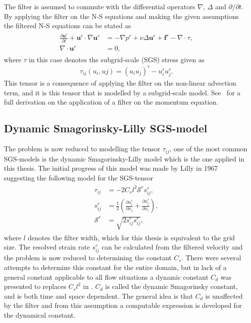 The filter is assumed to commute with 
the differential operators $\nabla$, $\Delta$ and $\partial / \partial t$. By applying the filter on the N-S equations
and making the given assumptions the filtered N-S equations can be stated as 
%
\begin{align}
    \begin{split}
        \frac{\partial \mathbf{u}^r}{\partial t} + \mathbf{u}^r\cdot \nabla\mathbf{u}^r
        &= -\nabla p^r +\nu\Delta \mathbf{u}^r+\mathbf{f}^r-\nabla \cdot \tau, \\
        \nabla \cdot \mathbf{u}^r &= 0,
    \end{split}
	\label{eq:NSfiltered}
\end{align}
%
where $\tau$ in this case denotes the subgrid-scale (SGS) stress given as 
\begin{align}
    \tau_{ij}(u_i,uj) = (u_iu_j)^r -u_i^ru_j^r.
    \label{eq:sgstensor}
\end{align}
%
This tensor is a consequence of applying the filter on the non-linear advection term, 
and it is this tensor that is modelled by a subgrid-scale model. See~\cite{Pope} for a full derivation on the 
application of a filter on the momentum equation. 

\subsection{Dynamic Smagorinsky-Lilly SGS-model}
The problem is now reduced to modelling the tensor $\tau_{ij}$, one of the most common SGS-models is the 
dynamic Smagorinsky-Lilly model which is the one applied in this thesis. The initial progress of this model was made by 
Lilly in 1967~\cite{Lilly67} suggesting the following model for the SGS-tensor
%
\begin{align}
    \begin{split}
    \tau_{ij} &= -2C_sl^2\mathcal{S}^rs_{ij}^r,\\
    s^r_{ij} &= \frac{1}{2}\left( \frac{\partial u^r_i}{\partial x_j} +
    \frac{\partial u^r_j}{\partial x_i}\right),\\
    \mathcal{S}^r &= \sqrt{2s^r_{ij}s^r_{ij}},
    \end{split}
    \label{eq:boussinesq}
\end{align}
%
where $l$ denotes the filter width, which for this thesis is equivalent to the grid size.
The resolved strain rate $s^r_{ij}$ can be calculated from the filtered velocity and the problem is now reduced to determining
the constant $C_s$. There were several attempts to determine this constant for the entire domain, but in lack of a general 
constant applicable to all flow situations a dynamic constant $C_d$ was presented to replaces $C_sl^2$ in .
$C_d$ is called the dynamic Smagorinsky constant, and is both time and space dependent.
The general idea is that $C_d$ is unaffected by the filter and from this 
assumption a computable expression is developed for the dynamical constant.

